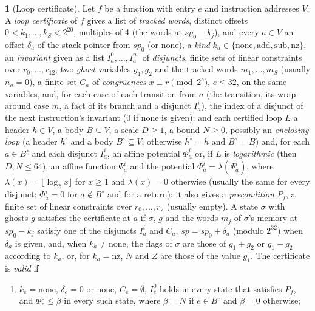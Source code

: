 \documentclass[oneside,english]{amsart}
\numberwithin{equation}{section}
\theoremstyle{plain}
\theoremstyle{definition}
\newtheorem{defn}[thm]{\protect\definitionname}
\theoremstyle{plain}
\theoremstyle{plain}
\theoremstyle{remark}
\providecommand{\definitionname}{Definition}
\begin{document}
\begin{defn}[Loop certificate]
\label{def:loop-certificate}
Let $f$ be a function with entry $e$ and instruction addresses $V$. A \emph{loop certificate} of $f$ gives a list of \emph{tracked words}, distinct offsets $0 < k_1, \dots, k_S < 2^{20}$, multiples of 4 (the words at $\mathit{sp}_0 - k_j$), and every $a \in V$ an offset $\delta_a$ of the stack pointer from $\mathit{sp}_0$ (or none), a \emph{kind} $k_a \in \{\mathrm{none}, \mathrm{add}, \mathrm{sub}, \mathrm{nz}\}$, an \emph{invariant} given as a list $I_a^0, \dots, I_a^{n_a}$ of \emph{disjuncts}, finite sets of linear constraints over $r_0, \dots, r_{12}$, two \emph{ghost} variables $g_1, g_2$ and the tracked words $m_1, \dots, m_S$ (usually $n_a = 0$), a finite set $C_a$ of \emph{congruences} $x \equiv r \pmod{2^{e}}$, $e \le 32$, on the same variables, and, for each case of each transition from $a$ (the transition, its wrap-around case $m$, a fact of its branch and a disjunct $I_a^i$), the index of a disjunct of the next instruction's invariant ($0$ if none is given); and each certified loop $L$ a header $h \in V$, a body $B \subseteq V$, a scale $D \ge 1$, a bound $N \ge 0$, possibly an \emph{enclosing loop} (a header $h^\circ$ and a body $B^\circ \subseteq V$; otherwise $h^\circ = h$ and $B^\circ = B$) and, for each $a \in B^\circ$ and each disjunct $I_a^i$, an affine potential $\Phi_a^i$ or, if $L$ is \emph{logarithmic} (then $D, N \le 64$), an affine function $\Psi_a^i$ and the potential $\Phi_a^i = \lambda(\Psi_a^i)$, where $\lambda(x) = \lfloor \log_2 x \rfloor$ for $x \ge 1$ and $\lambda(x) = 0$ otherwise (usually the same for every disjunct; $\Phi_a^i = 0$ for $a \notin B^\circ$ and for a return); it also gives a \emph{precondition} $P_f$, a finite set of linear constraints over $r_0, \dots, r_7$ (usually empty). A state $\sigma$ with ghosts $g$ satisfies the certificate at $a$ if $\sigma$, $g$ and the words $m_j$ of $\sigma$'s memory at $\mathit{sp}_0 - k_j$ satisfy one of the disjuncts $I_a^i$ and $C_a$, $\mathit{sp} = \mathit{sp}_0 + \delta_a$ (modulo $2^{32}$) when $\delta_a$ is given, and, when $k_a \ne \mathrm{none}$, the flags of $\sigma$ are those of $g_1 + g_2$ or $g_1 - g_2$ according to $k_a$, or, for $k_a = \mathrm{nz}$, $N$ and $Z$ are those of the value $g_1$. The certificate is \emph{valid} if
\begin{enumerate}
  \item $k_e = \mathrm{none}$, $\delta_e = 0$ or none, $C_e = \emptyset$, $I_e^0$ holds in every state that satisfies $P_f$, and $\Phi_e^0 \le \beta$ in every such state, where $\beta = N$ if $e \in B^\circ$ and $\beta = 0$ otherwise;

\end{enumerate}
\end{defn}
\end{document}
